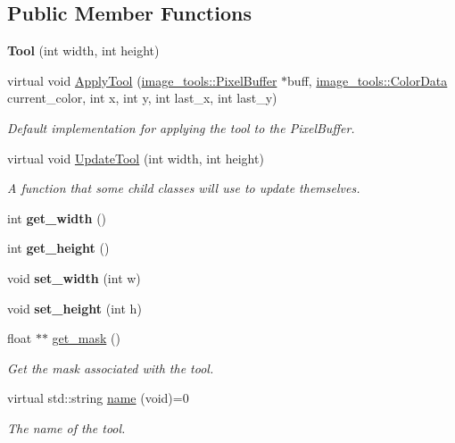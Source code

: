 \subsection*{Public Member Functions}
\begin{DoxyCompactItemize}
\item 
{\bfseries Tool} (int width, int height)\hypertarget{classTool_a23a56267df546dc35df1821b361edf3c}{}\label{classTool_a23a56267df546dc35df1821b361edf3c}

\item 
virtual void \hyperlink{classTool_a03fdae3fde745872d82613ef44d2b6db}{Apply\+Tool} (\hyperlink{classimage__tools_1_1PixelBuffer}{image\+\_\+tools\+::\+Pixel\+Buffer} $\ast$buff, \hyperlink{classimage__tools_1_1ColorData}{image\+\_\+tools\+::\+Color\+Data} current\+\_\+color, int x, int y, int last\+\_\+x, int last\+\_\+y)
\begin{DoxyCompactList}\small\item\em Default implementation for applying the tool to the Pixel\+Buffer. \end{DoxyCompactList}\item 
virtual void \hyperlink{classTool_a75aa418e0f85de582186ae019a4fc25e}{Update\+Tool} (int width, int height)
\begin{DoxyCompactList}\small\item\em A function that some child classes will use to update themselves. \end{DoxyCompactList}\item 
int {\bfseries get\+\_\+width} ()\hypertarget{classTool_ab8ff946d69d860478ae6b004291b9ad8}{}\label{classTool_ab8ff946d69d860478ae6b004291b9ad8}

\item 
int {\bfseries get\+\_\+height} ()\hypertarget{classTool_add1a33fd6177bb51bdb9060a56dbf7f9}{}\label{classTool_add1a33fd6177bb51bdb9060a56dbf7f9}

\item 
void {\bfseries set\+\_\+width} (int w)\hypertarget{classTool_a9a717324220867ba4cd21203de0e4597}{}\label{classTool_a9a717324220867ba4cd21203de0e4597}

\item 
void {\bfseries set\+\_\+height} (int h)\hypertarget{classTool_a99f10783bede1edf7b8af5a59b859137}{}\label{classTool_a99f10783bede1edf7b8af5a59b859137}

\item 
float $\ast$$\ast$ \hyperlink{classTool_a68dabcbd50e627e058b139fc47026c6f}{get\+\_\+mask} ()
\begin{DoxyCompactList}\small\item\em Get the mask associated with the tool. \end{DoxyCompactList}\item 
virtual std\+::string \hyperlink{classTool_a89abd746706ed78911924a47928d6d06}{name} (void)=0
\begin{DoxyCompactList}\small\item\em The name of the tool. \end{DoxyCompactList}\end{DoxyCompactItemize}
